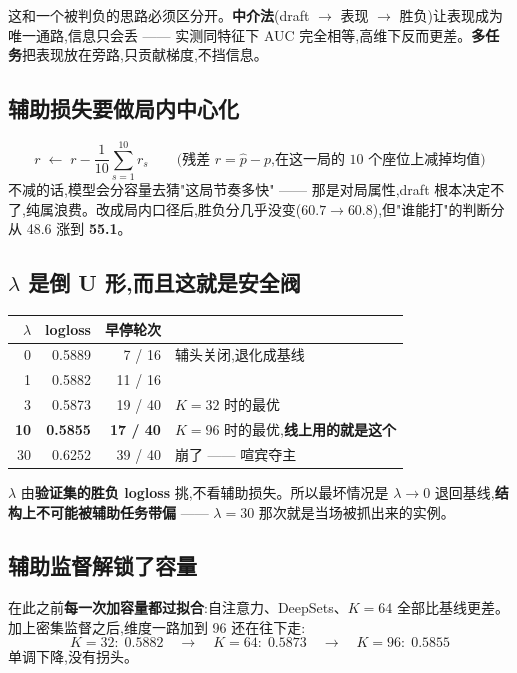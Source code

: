 \documentclass[11pt,a4paper]{article}
\newcommand{\negx}[1]{\textcolor{brick}{#1}}
\begin{document}
\medskip
这和一个被判负的思路必须区分开。\textbf{中介法}(draft $\to$ 表现 $\to$ 胜负)让表现成为唯一通路,信息只会丢 —— 实测同特征下 AUC 完全相等,高维下反而更差。\textbf{多任务}把表现放在旁路,只贡献梯度,不挡信息。

\subsection{辅助损失要做局内中心化}
\[
r \;\leftarrow\; r - \frac{1}{10}\sum_{s=1}^{10} r_s
\qquad\text{(残差 }r=\hat{p}-p\text{,在这一局的 10 个座位上减掉均值)}
\]
不减的话,模型会分容量去猜"这局节奏多快" —— 那是对局属性,draft 根本决定不了,纯属浪费。改成局内口径后,胜负分几乎没变($60.7\to60.8$),但"谁能打"的判断分从 48.6 涨到 \textbf{55.1}。

\subsection{$\lambda$ 是倒 U 形,而且这就是安全阀}

\begin{center}
\begin{tabular}{@{}rrrl@{}}
\toprule
$\lambda$ & logloss & 早停轮次 & \\
\midrule
0 & 0.5889 & 7 / 16 & 辅头关闭,退化成基线\\
1 & 0.5882 & 11 / 16 & \\
3 & 0.5873 & 19 / 40 & $K=32$ 时的最优\\
\textbf{10} & \textbf{0.5855} & \textbf{17 / 40} & $K=96$ 时的最优,\textbf{线上用的就是这个}\\
30 & \negx{0.6252} & 39 / 40 & \negx{崩了} —— 喧宾夺主\\
\bottomrule
\end{tabular}
\end{center}

$\lambda$ 由\textbf{验证集的胜负 logloss} 挑,不看辅助损失。所以最坏情况是 $\lambda\to0$ 退回基线,\textbf{结构上不可能被辅助任务带偏} —— $\lambda=30$ 那次就是当场被抓出来的实例。

\subsection{辅助监督解锁了容量}

在此之前\textbf{每一次加容量都过拟合}:自注意力、DeepSets、$K=64$ 全部比基线更差。加上密集监督之后,维度一路加到 96 还在往下走:
\[
K=32:\;0.5882 \quad\longrightarrow\quad K=64:\;0.5873 \quad\longrightarrow\quad K=96:\;\mathbf{0.5855}
\]
单调下降,没有拐头。
\end{document}
